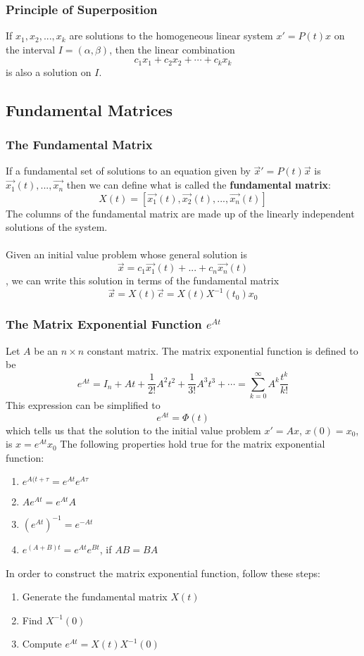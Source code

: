 \documentclass[11pt]{article}
\begin{document}
\subsubsection{Principle of Superposition}
If $x_1, x_2, ..., x_k$ are solutions to the homogeneous linear system $x' = P(t)x$ on the interval $I = (\alpha, \beta)$, then the linear combination
$$c_1x_1 + c_2x_2 +\cdots +c_kx_k$$ is also a solution on $I$.
\subsection{Fundamental Matrices}
\subsubsection{The Fundamental Matrix}
If a fundamental set of solutions to an equation given by $\vec{x}' = P(t)\vec{x}$ is $\vec{x_1}(t), ..., \vec{x_n}$ then we can define what is called the \textbf{fundamental matrix}:
$$X(t) = [\vec{x_1}(t), \vec{x_2}(t), ..., \vec{x_n}(t)]$$
The columns of the fundamental matrix are made up of the linearly independent solutions of the system. \\ \\ 
Given an initial value problem whose general solution is $$ \vec{x} = c_1\vec{x_1}(t) + ... + c_n\vec{x_n}(t)$$, we can write this solution in terms of the fundamental matrix
$$\vec{x} = X(t)\vec{c} = X(t)X^{-1}(t_0)x_0$$
\subsubsection{The Matrix Exponential Function $e^{At}$}
Let $A$ be an $n \times n$ constant matrix. The matrix exponential function is defined to be 
$$ e^{At} = I_n + At + \frac{1}{2!}A^2t^2 + \frac{1}{3!}A^3t^3 + \cdots = \sum_{k=0}^{\infty} A^k \frac{t^k}{k!}$$
This expression can be simplified to $$ e^{At} = \Phi(t)$$ which tells us that the solution to the initial value problem $x'=Ax$, $x(0) = x_0$, is $x = e^{At}x_0$ The following properties hold true for the matrix exponential function:
\begin{enumerate}
\item $e^{A(t+\tau} = e^{At}e^{A\tau}$
\item $Ae^{At} = e^{At}A$ 
\item $(e^{At})^{-1} = e^{-At}$
\item $e^{(A+B)t} = e^{At}e^{Bt}$, if $AB = BA$
\end{enumerate}
In order to construct the matrix exponential function, follow these steps:
\begin{enumerate}
\item Generate the fundamental matrix $X(t)$
\item Find $X^{-1}(0)$
\item Compute $e^{At} = X(t)X^{-1}(0)$ 
\end{enumerate}
\end{document}
